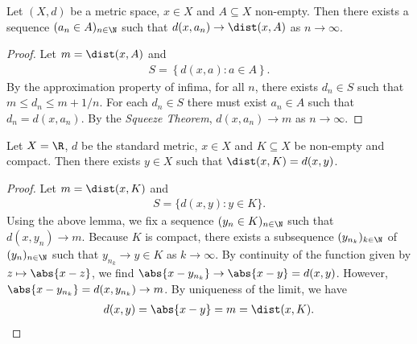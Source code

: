 \documentclass{article}
\begin{document}
\begin{lemma*}
   Let $(X,d)$ be a metric space, $x\in X$ and $A\subseteq X$ non-empty. Then there exists a sequence 
   $(a_n\in A)_{n\in\N}$ such that $d(x,a_n)\to\dist(x,A)$ as $n\to\infty$.
   \begin{proof}
      Let $m=\dist(x,A)$ and
      \begin{align*}
         S=\left\lbrace d(x,a):a\in A\right\rbrace.
      \end{align*}
      By the approximation property of infima, for all $n$, there exists $d_n\in S$
      such that $m\leq d_n\leq m+1/n$. For each $d_n\in S$ there must exist $a_n\in A$ 
      such that $d_n=d(x,a_n)$. By the \emph{Squeeze Theorem}, $d(x,a_n)\to m$ as 
      $n\to\infty$.
   \end{proof}
\end{lemma*}

\begin{claim*}[3]
   Let $X=\R$, $d$ be the standard metric, $x\in X$ and $K\subseteq X$ be non-empty and compact. 
   Then there exists $y\in X$ such that $\dist(x,K)=d(x,y)$.
   \begin{proof}
      Let $m=\dist(x,K)$ and
      \begin{align*}
         S=\{d(x,y):y\in K\}.
      \end{align*}
      Using the above lemma, we fix a sequence $(y_n\in K)_{n\in\N}$ such that 
      $d(x,y_n)\to m$.
      Because $K$ is compact, there exists a subsequence $(y_{n_k})_{k\in\N}$ of $(y_n)_{n\in\N}$ such that 
      $y_{n_k} \to y\in K$ as $k\to\infty$. By continuity of the function given by $z\mapsto\abs{x-z}$,
      we find $\abs{x-y_{n_k}}\to\abs{x-y}=d(x,y)$. However, $\abs{x-y_{n_k}}=d(x,y_{n_k})\to m$. By uniqueness of the 
      limit, we have 
      \begin{align*}
         d(x,y)=\abs{x-y}=m=\dist(x,K).
      \end{align*}
   \end{proof}
\end{claim*}
\end{document}
